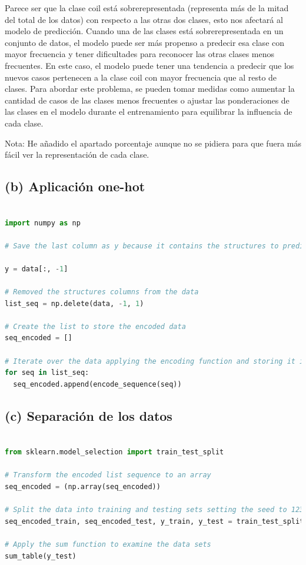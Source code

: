 \documentclass[
]{article}
\begin{document}
Parece ser que la clase coil está sobrerepresentada (representa más de
la mitad del total de los datos) con respecto a las otras dos clases,
esto nos afectará al modelo de predicción. Cuando una de las clases está
sobrerepresentada en un conjunto de datos, el modelo puede ser más
propenso a predecir esa clase con mayor frecuencia y tener dificultades
para reconocer las otras clases menos frecuentes. En este caso, el
modelo puede tener una tendencia a predecir que los nuevos casos
pertenecen a la clase coil con mayor frecuencia que al resto de clases.
Para abordar este problema, se pueden tomar medidas como aumentar la
cantidad de casos de las clases menos frecuentes o ajustar las
ponderaciones de las clases en el modelo durante el entrenamiento para
equilibrar la influencia de cada clase.

Nota: He añadido el apartado porcentaje aunque no se pidiera para que
fuera más fácil ver la representación de cada clase.

\hypertarget{b-aplicaciuxf3n-one-hot}{%
\subsection{(b) Aplicación one-hot}\label{b-aplicaciuxf3n-one-hot}}

\begin{lstlisting}[language=Python]

import numpy as np

# Save the last column as y because it contains the structures to predict

y = data[:, -1]

# Removed the structures columns from the data
list_seq = np.delete(data, -1, 1)

# Create the list to store the encoded data
seq_encoded = []

# Iterate over the data applying the encoding function and storing it in the list
for seq in list_seq:
  seq_encoded.append(encode_sequence(seq))
\end{lstlisting}

\hypertarget{c-separaciuxf3n-de-los-datos}{%
\subsection{(c) Separación de los
datos}\label{c-separaciuxf3n-de-los-datos}}

\begin{lstlisting}[language=Python]

from sklearn.model_selection import train_test_split

# Transform the encoded list sequence to an array
seq_encoded = (np.array(seq_encoded))

# Split the data into training and testing sets setting the seed to 123
seq_encoded_train, seq_encoded_test, y_train, y_test = train_test_split(seq_encoded, y ,test_size=0.33,  random_state=123)

# Apply the sum function to examine the data sets
sum_table(y_test)
\end{lstlisting}
\end{document}
